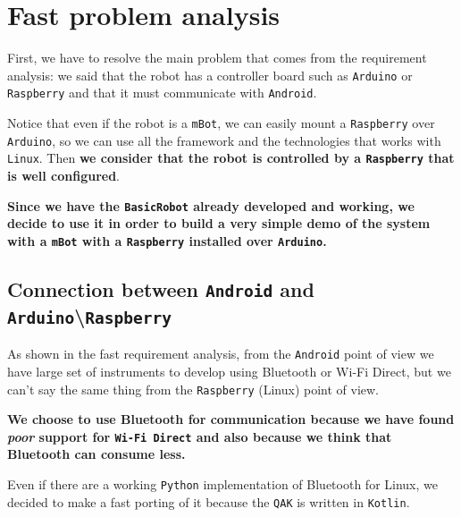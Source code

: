 \section{Fast problem analysis}

First, we have to resolve the main problem that comes from the requirement analysis: we said that the robot has a controller board such as \texttt{Arduino} or \texttt{Raspberry} and that it must communicate with \texttt{Android}. 

Notice that even if the robot is a \texttt{mBot}, we can easily mount a \texttt{Raspberry} over \texttt{Arduino}, so we can use all the framework and the technologies that works with \texttt{Linux}.
Then \textbf{we consider that the robot is controlled by a \texttt{Raspberry} that is well configured}.

\begin{tcolorbox}
	\begin{center}
		\textbf{Since we have the \texttt{BasicRobot} already developed and working, we decide to use it in order to build a very simple demo of the system with a \texttt{mBot} with a \texttt{Raspberry} installed over \texttt{Arduino}.}
	\end{center}
\end{tcolorbox}

\subsection{Connection between \texttt{Android} and \texttt{Arduino}\textbackslash\texttt{Raspberry}}

As shown in the fast requirement analysis, from the \texttt{Android} point of view we have large set of instruments to develop using Bluetooth or Wi-Fi Direct, but we can't say the same thing from the \texttt{Raspberry} (Linux) point of view.

\begin{tcolorbox}
	\begin{center}
		\textbf{We choose to use Bluetooth for communication because we have found \textit{poor} support for \texttt{Wi-Fi Direct} and also because we think that Bluetooth can consume less.}
	\end{center}
\end{tcolorbox}

Even if there are a working \texttt{Python} implementation of Bluetooth for Linux, we decided to make a fast porting of it because the \texttt{QAK} is written in \texttt{Kotlin}.

